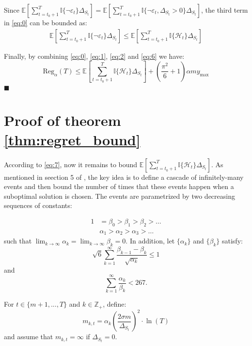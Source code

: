 \documentclass[opre,sglanonrev]{informs4}
\begin{document}
Since $\mathbb{E}[\sum_{t=t_0+1}^{T}\mathbb{I}\{\lnot \varepsilon_t\}\Delta_{S_t}] = \mathbb{E}[\sum_{t=t_0+1}^{T}\mathbb{I}\{\lnot \varepsilon_t, \Delta_{S_t}>0\}\Delta_{S_t}]$, the third term in \ref{eq:0} can be bounded as:
\begin{equation}
    \label{eq:6}
	\begin{aligned}
		\mathbb{E}[\sum_{t=t_0+1}^{T}\mathbb{I}\{\lnot \varepsilon_t\}\Delta_{S_t}]\leq \mathbb{E}[\sum_{t=t_0+1}^{T}\mathbb{I}\{\mathcal{H}_t\}\Delta_{S_t}]
	\end{aligned}
\end{equation}

Finally, by combining \ref{eq:0}, \ref{eq:1}, \ref{eq:2} and \ref{eq:6}  we have:
\begin{equation}
    \label{eq:7}
	\text{Reg}_{\alpha}(T) \leq \mathbb{E}[\sum_{t=t_0+1}^{T}\mathbb{I}\{\mathcal{H}_t\}\Delta_{S_t}] + (\frac{\pi^2}{6}+1)\alpha m y_{\text{max}}
\end{equation}
\hfill $\blacksquare$

\section{Proof of theorem \ref{thm:regret_bound}}
According to \ref{eq:7}, now it remains to bound $\mathbb{E}[\sum_{t=t_0+1}^{T}\mathbb{I}\{\mathcal{H}_t\}\Delta_{S_t}]$. As mentioned in seection 5 of \cite{Kveton2014TightRB}, the key idea is to define a cascade of infinitely-many events and then bound the number of times that these events happen when a suboptimal solution is chosen. The events are parametrized by two decreasing sequences of constants:

$$\begin{aligned}
1 & =\beta_0>\beta_1>\beta_2>\ldots \\
 & \alpha_1>\alpha_2>\alpha_3>\ldots
\end{aligned}$$
such that $\lim_{k \to \infty}\alpha_k = \lim_{k \to \infty}\beta_k=0$. In addition, let $\{\alpha_k\}$ and $\{\beta_k\}$ satisfy:
\begin{equation}\sqrt{6}\sum_{k=1}^\infty\frac{\beta_{k-1}-\beta_k}{\sqrt{\alpha_k}}\leq1\end{equation}
and
\begin{equation}
    \label{eq:8}
    \sum_{k=1}^\infty\frac{\alpha_k}{\beta_k}<267.
\end{equation}

For $t \in \{m+1,...,T\}$ and $k \in \mathbb{Z}_+$, define: 
$$
    m_{k,t} = \alpha_k\left(\frac{2\sigma m}{\Delta_{S_t}}\right)^2\cdot \ln(T)
$$
and assume that $m_{k,t} = \infty$ if $\Delta_{S_t}=0$.
\end{document}
